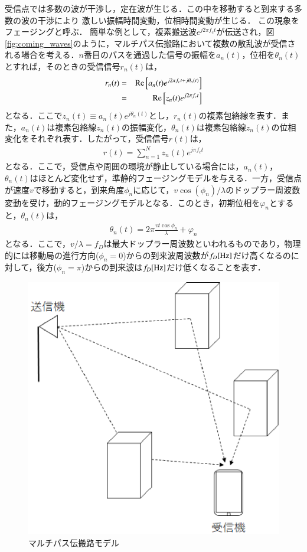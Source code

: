 受信点では多数の波が干渉し，定在波が生じる．この中を移動すると到来する多数の波の干渉により
激しい振幅時間変動，位相時間変動が生じる．
この現象をフェージングと呼ぶ\cite{okumura}．
簡単な例として，複素搬送波$e^{j2\pi f_ct}$が伝送され，図 \ref{fig:coming_waves}のように，マルチパス伝搬路において複数の散乱波が受信される場合を考える．$n$番目のパスを通過した信号の振幅を$a_n(t)$，位相を$\theta_n(t)$とすれば，そのときの受信信号$r_n(t)$は，
\begin{eqnarray}
r_n(t)&=&{\rm Re}\left[a_n(t)e^{j2\pi f_c t+j\theta_n(t)}\right]\nonumber \\
&=&{\rm Re}\left[z_n(t)e^{j2\pi f_c t}\right]
\end{eqnarray}
となる．ここで$z_n(t)\equiv a_n(t)e^{j\theta_n(t)}$とし，$r_n(t)$の複素包絡線を表す．また，$a_n(t)$は複素包絡線$z_n(t)$の振幅変化，$\theta_n(t)$は複素包絡線$z_n(t)$の位相変化をそれぞれ表す．したがって，受信信号$r(t)$は，
\begin{eqnarray}
r(t)=\sum_{n=1}^{N}z_n(t)e^{j\pi f_ct}
\end{eqnarray}
となる．ここで，受信点や周囲の環境が静止している場合には，$a_n(t)$，$\theta_n(t)$はほとんど変化せず，準静的フェージングモデルを与える．一方，受信点が速度$v$で移動すると，到来角度$\phi_n$に応じて，$v\cos(\phi_n)/\lambda$のドップラー周波数変動を受け，動的フェージングモデルとなる．このとき，初期位相を$\varphi_n$とすると，$\theta_n(t)$は，
\begin{eqnarray}
\theta_n(t)=2\pi\frac{vt\cos\phi_n}{\lambda}+\varphi_n
\end{eqnarray}
となる．ここで，$v/\lambda=f_D$は最大ドップラー周波数といわれるものであり，物理的には移動局の進行方向($\phi_n=0$)からの到来波周波数が$f_D[{\rm Hz}]$だけ高くなるのに対して，後方($\phi_n=\pi$)からの到来波は$f_D[{\rm Hz}]$だけ低くなることを表す．
\begin{figure}[h]
  \begin{center}
    \includegraphics[width=0.6\linewidth]{chapter2/figure/multipaths.eps}
    \caption{マルチパス伝搬路モデル}
    \label{fig:multipath}
  \end{center}
\end{figure}


